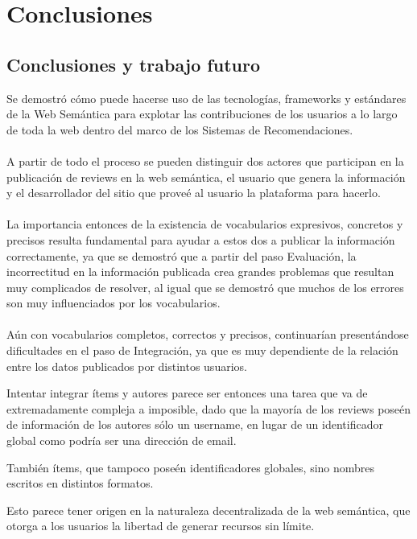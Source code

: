 \part{Conclusiones}

\chapter{Conclusiones y trabajo futuro}
\label{chapter:conclusiones}

\noindent Se demostró cómo puede hacerse uso de las tecnologías, frameworks y estándares de la Web 
Semántica para explotar las contribuciones de los usuarios a lo largo de toda la web dentro 
del marco de los Sistemas de Recomendaciones.
\\\\
A partir de todo el proceso se pueden distinguir dos actores que participan en la publicación 
de reviews en la web semántica, el usuario que genera la información y el desarrollador
del sitio que proveé al usuario la plataforma para hacerlo.
\\\\
La importancia entonces de la existencia de vocabularios expresivos, concretos y precisos 
resulta fundamental para ayudar a estos dos a publicar la información correctamente, ya que 
se demostró que a partir del paso Evaluación, la incorrectitud en la información publicada 
crea grandes problemas que resultan muy complicados de resolver, al igual que se demostró 
que muchos de los errores son muy influenciados por los vocabularios.
\\\\
Aún con vocabularios completos, correctos y precisos, continuarían presentándose dificultades en 
el paso de Integración, ya que es muy dependiente de la relación entre los datos publicados 
por distintos usuarios.

Intentar integrar ítems y autores parece ser entonces una tarea que va de extremadamente compleja 
a imposible, dado que la mayoría de los reviews poseén de información de los autores sólo un username, 
en lugar de un identificador global como podría ser una dirección de email.

También ítems, que tampoco poseén identificadores globales, sino nombres escritos en 
distintos formatos.

Esto parece tener origen en la naturaleza decentralizada de la web semántica, que otorga 
a los usuarios la libertad de generar recursos sin límite.

